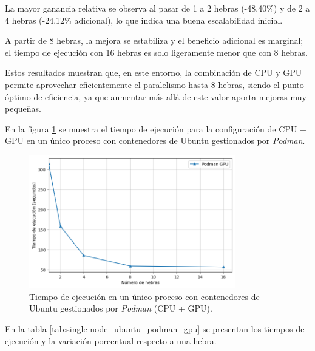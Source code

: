 La mayor ganancia relativa se observa al pasar de 1 a 2 hebras (-48.40\%) y de 2 a 4 hebras (-24.12\% adicional), lo que indica una buena escalabilidad inicial.

A partir de 8 hebras, la mejora se estabiliza y el beneficio adicional es marginal; el tiempo de ejecución con 16 hebras es solo ligeramente menor que con 8 hebras.

Estos resultados muestran que, en este entorno, la combinación de CPU y GPU permite aprovechar eficientemente el paralelismo hasta 8 hebras, siendo el punto óptimo de eficiencia, ya que aumentar más allá de este valor aporta mejoras muy pequeñas.

En la figura \ref{fig:single-node_ubuntu_podman_gpu_time} se muestra el tiempo de ejecución para la configuración de CPU + GPU en un único proceso con contenedores de Ubuntu gestionados por \textit{Podman}.

\begin{figure}[ht]
    \centering
    \includegraphics[width=0.8\textwidth]{imagenes/cap5/single-node_ubuntu_podman_gpu_time.png}
    \caption{Tiempo de ejecución en un único proceso con contenedores de Ubuntu gestionados por \textit{Podman} (CPU + GPU).}
    \label{fig:single-node_ubuntu_podman_gpu_time}
\end{figure}

En la tabla \ref{tab:single-node_ubuntu_podman_gpu} se presentan los tiempos de ejecución y la variación porcentual respecto a una hebra.

